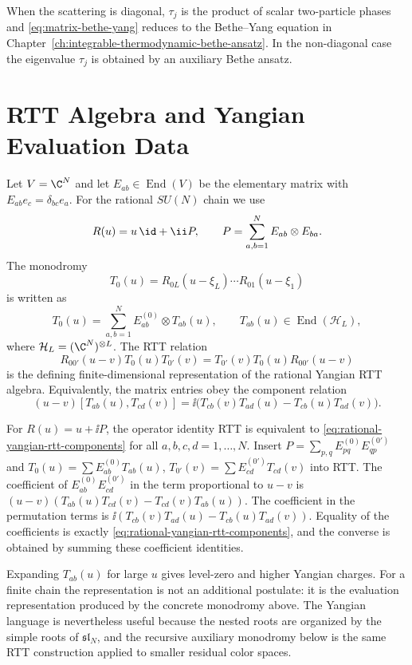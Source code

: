 When the scattering is diagonal, \(\tau_j\) is the product of scalar
two-particle phases and \eqref{eq:matrix-bethe-yang} reduces to the
Bethe--Yang equation in
Chapter~\ref{ch:integrable-thermodynamic-bethe-ansatz}.  In the non-diagonal
case the eigenvalue \(\tau_j\) is obtained by an auxiliary Bethe ansatz.

\section{RTT Algebra and Yangian Evaluation Data}

Let \(V=\C^N\) and let \(E_{ab}\in\operatorname{End}(V)\) be the elementary
matrix with \(E_{ab}e_c=\delta_{bc}e_a\).  For the rational \(SU(N)\) chain
we use
\[
  R(u)=u\,\id+\ii P,\qquad
  P=\sum_{a,b=1}^{N}E_{ab}\otimes E_{ba}.
\]
The monodromy
\[
  T_0(u)=R_{0L}(u-\xi_L)\cdots R_{01}(u-\xi_1)
\]
is written as
\[
  T_0(u)=\sum_{a,b=1}^{N}E_{ab}^{(0)}\otimes T_{ab}(u),
  \qquad T_{ab}(u)\in\operatorname{End}(\mathcal H_L),
\]
where \(\mathcal H_L=(\C^N)^{\otimes L}\).  The RTT relation
\[
  R_{00'}(u-v)T_0(u)T_{0'}(v)
  =
  T_{0'}(v)T_0(u)R_{00'}(u-v)
\]
is the defining finite-dimensional representation of the rational Yangian
RTT algebra.  Equivalently, the matrix entries obey the component relation
\begin{equation}
  (u-v)[T_{ab}(u),T_{cd}(v)]
  =
  \ii\bigl(
    T_{cb}(v)T_{ad}(u)-T_{cb}(u)T_{ad}(v)
  \bigr).
  \label{eq:rational-yangian-rtt-components}
\end{equation}

For \(R(u)=u+\ii P\), the operator identity RTT is equivalent to
\eqref{eq:rational-yangian-rtt-components} for all
\(a,b,c,d=1,\ldots,N\).
Insert \(P=\sum_{p,q}E_{pq}^{(0)}E_{qp}^{(0')}\) and
\(T_0(u)=\sum E_{ab}^{(0)}T_{ab}(u)\),
\(T_{0'}(v)=\sum E_{cd}^{(0')}T_{cd}(v)\) into RTT.  The coefficient of
\(E_{ab}^{(0)}E_{cd}^{(0')}\) in the term proportional to \(u-v\) is
\((u-v)(T_{ab}(u)T_{cd}(v)-T_{cd}(v)T_{ab}(u))\).  The coefficient in the
permutation terms is
\(\ii(T_{cb}(v)T_{ad}(u)-T_{cb}(u)T_{ad}(v))\).  Equality of the coefficients
is exactly \eqref{eq:rational-yangian-rtt-components}, and the converse is
obtained by summing these coefficient identities.

Expanding \(T_{ab}(u)\) for large \(u\) gives level-zero and higher Yangian
charges.  For a finite chain the representation is not an additional
postulate: it is the evaluation representation produced by the concrete
monodromy above.  The Yangian language is nevertheless useful because the
nested roots are organized by the simple roots of \(\mathfrak{sl}_N\), and
the recursive auxiliary monodromy below is the same RTT construction applied
to smaller residual color spaces.

